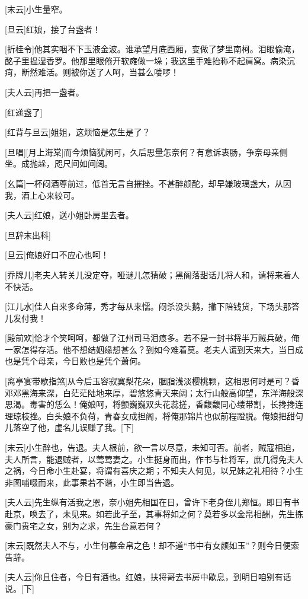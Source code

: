 \documentclass{book}
\begin{document}
[末云]小生量窄。

[旦云]红娘，接了台盏者！

[折桂令]他其实咽不下玉液金波。谁承望月底西厢，变做了梦里南柯。泪眼偷淹，酩子里揾湿香罗。他那里眼倦开软瘫做一垛；我这里手难抬称不起肩窝。病染沉疴，断然难活。则被你送了人呵，当甚么喽啰！

[夫人云]再把一盏者。

[红递盏了]

[红背与旦云]姐姐，这烦恼是怎生是了？

[旦唱][月上海棠]而今烦恼犹闲可，久后思量怎奈何？有意诉衷肠，争奈母亲侧坐。成抛趓，咫尺间如间阔。

[幺篇]一杯闷酒尊前过，低首无言自摧挫。不甚醉颜酡，却早嫌玻璃盏大，从因我，酒上心来较可。

[夫人云]红娘，送小姐卧房里去者。

[旦辞末出科]

[旦云]俺娘好口不应心也呵！

[乔牌儿]老夫人转关儿没定夺，哑谜儿怎猜破；黑阁落甜话儿将人和，请将来着人不快活。

[江儿水]佳人自来多命薄，秀才每从来懦。闷杀没头鹅，撇下陪钱货，下场头那答儿发付我！

[殿前欢]恰才个笑呵呵，都做了江州司马泪痕多。若不是一封书将半万贼兵破，俺一家怎得存活。他不想结姻缘想甚么？到如今难着莫。老夫人谎到天来大，当日成也是凭个母亲，今日败也是凭个萧何。

[离亭宴带歇指煞]从今后玉容寂寞梨花朵，胭脂浅淡樱桃颗，这相思何时是可？昏邓邓黑海来深，白茫茫陆地来厚，碧悠悠青天来阔；太行山般高仰望，东洋海般深思渴。毒害的恁么！俺娘呵，将颤巍巍双头花蕊搓，香馥馥同心缕带割，长搀搀连理琼枝挫。白头娘不负荷，青春女成担阁，将俺那锦片也似前程蹬脱。俺娘把甜句儿落空了他，虚名儿误赚了我。[下]

[末云]小生醉也，告退。夫人根前，欲一言以尽意，未知可否。前者，贼寇相迫，夫人所言，能退贼者，以莺莺妻之。小生挺身而出，作书与杜将军，庶几得免夫人之祸，今日命小生赴宴，将谓有喜庆之期；不知夫人何见，以兄妹之礼相待？小生非图哺啜而来，此事果若不谐，小生即当告退。

[夫人云]先生纵有活我之恩，奈小姐先相国在日，曾许下老身侄儿郑恒。即日有书赴京，唤去了，未见来。如若此子至，其事将如之何？莫若多以金帛相酬，先生拣豪门贵宅之女，别为之求，先生台意若何？

[末云]既然夫人不与，小生何慕金帛之色！却不道``书中有女颜如玉''？则今日便索告辞。

[夫人云]你且住者，今日有酒也。红娘，扶将哥去书房中歇息，到明日咱别有话说。[下]
\end{document}
